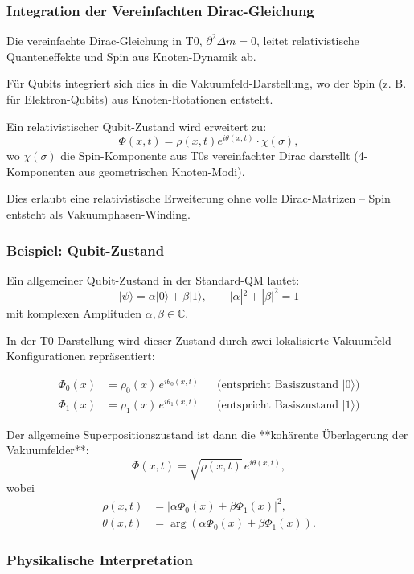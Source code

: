\documentclass[12pt,a4paper]{article}
\begin{document}
	\subsubsection{Integration der Vereinfachten Dirac-Gleichung}
	
	Die vereinfachte Dirac-Gleichung in T0, $\partial^2 \Delta m = 0$, leitet relativistische Quanteneffekte und Spin aus Knoten-Dynamik ab.
	
	Für Qubits integriert sich dies in die Vakuumfeld-Darstellung, wo der Spin (z. B. für Elektron-Qubits) aus Knoten-Rotationen entsteht.
	
	Ein relativistischer Qubit-Zustand wird erweitert zu:
	\[
	\Phi(x,t) = \rho(x,t) e^{i\theta(x,t)} \cdot \chi(\sigma),
	\]
	wo $\chi(\sigma)$ die Spin-Komponente aus T0s vereinfachter Dirac darstellt (4-Komponenten aus geometrischen Knoten-Modi).
	
	Dies erlaubt eine relativistische Erweiterung ohne volle Dirac-Matrizen – Spin entsteht als Vakuumphasen-Winding.
	
	\subsubsection{Beispiel: Qubit-Zustand}
	
	Ein allgemeiner Qubit-Zustand in der Standard-QM lautet:
	\[
	|\psi\rangle = \alpha |0\rangle + \beta |1\rangle, \qquad |\alpha|^2 + |\beta|^2 = 1
	\]
	mit komplexen Amplituden $\alpha, \beta \in \mathbb{C}$.
	
	In der T0-Darstellung wird dieser Zustand durch zwei lokalisierte Vakuumfeld-Konfigurationen repräsentiert:
	
	\begin{align}
		\Phi_0(x) &= \rho_0(x) \, e^{i \theta_0(x,t)} && \text{(entspricht Basiszustand } |0\rangle\text{)} \\
		\Phi_1(x) &= \rho_1(x) \, e^{i \theta_1(x,t)} && \text{(entspricht Basiszustand } |1\rangle\text{)}
	\end{align}
	
	Der allgemeine Superpositionszustand ist dann die **kohärente Überlagerung der Vakuumfelder**:
	\[
	\Phi(x,t) = \sqrt{\rho(x,t)} \, e^{i \theta(x,t)},
	\]
	wobei
	\begin{align}
		\rho(x,t) &= |\alpha \Phi_0(x) + \beta \Phi_1(x)|^2, \\
		\theta(x,t) &= \arg(\alpha \Phi_0(x) + \beta \Phi_1(x)).
	\end{align}
	
	\subsubsection{Physikalische Interpretation}
	
\end{document}
